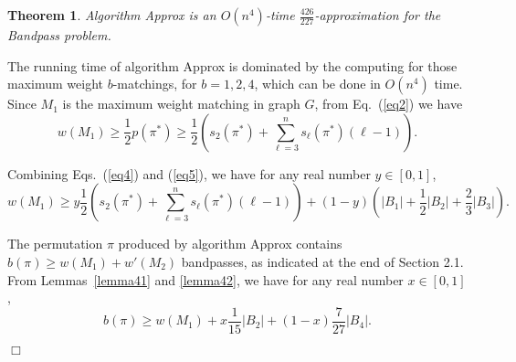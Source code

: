 \documentclass[11pt,twoside]{article}\usepackage{amssymb,latexsym,graphicx,hyperref}\usepackage{epstopdf}
\newtheorem{theorem}{Theorem}\newtheorem{lemma}{Lemma}
\newenvironment{proof}{{\sc Proof. }}{\hfill$\Box$\vspace{0.2in}}
\begin{document}
\begin{theorem}
\label{theorem1}
Algorithm {\sc Approx} is an $O(n^4)$-time $\frac {426}{227}$-approximation for the Bandpass problem.
\end{theorem}
\begin{proof}
The running time of algorithm {\sc Approx} is dominated by the computing for those maximum weight $b$-matchings, for $b = 1, 2, 4$,
which can be done in $O(n^4)$ time.
Since $M_1$ is the maximum weight matching in graph $G$, from Eq.~(\ref{eq2}) we have
\begin{equation}
\label{eq5}
w(M_1) \ge \frac 12 p(\pi^*) \ge \frac 12 \left(s_2(\pi^*) + \sum_{\ell = 3}^n s_\ell(\pi^*) (\ell - 1)\right).
\end{equation}


Combining Eqs.~(\ref{eq4}) and (\ref{eq5}), we have for any real number $y \in [0, 1]$,
\begin{equation}
\label{eq6}
w(M_1) \ge y \frac 12 \left(s_2(\pi^*) + \sum_{\ell = 3}^n s_\ell(\pi^*) (\ell - 1)\right)
				 + (1-y) \left(|B_1| + \frac 12 |B_2| + \frac 23 |B_3|\right).
\end{equation}


The permutation $\pi$ produced by algorithm {\sc Approx} contains $b(\pi) \ge w(M_1) + w'(M_2)$ bandpasses, as indicated at the end of Section 2.1.
From Lemmas~\ref{lemma41} and \ref{lemma42}, we have for any real number $x \in [0, 1]$,
\begin{equation}
\label{eq7}
b(\pi) \ge w(M_1) + x \frac 1{15} |B_2| + (1-x) \frac 7{27} |B_4|.
\end{equation}



\end{proof}
\end{document}
